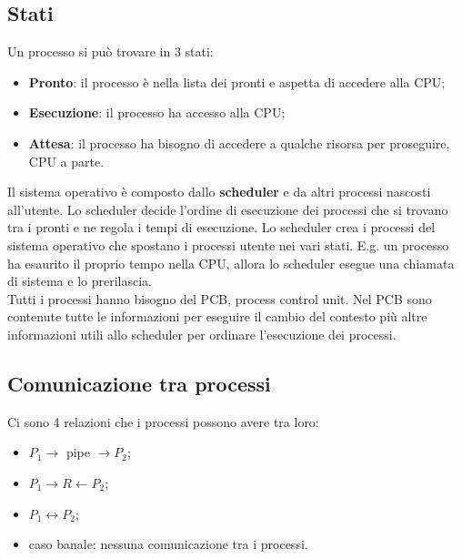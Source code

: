 \documentclass{article}
\begin{document}
\subsection{Stati}
Un processo si può trovare in 3 stati:
\begin{itemize}
  \item \textbf{Pronto}: il processo è nella lista dei pronti e aspetta di accedere alla CPU;

  \item \textbf{Esecuzione}: il processo ha accesso alla CPU;

  \item \textbf{Attesa}: il processo ha bisogno di accedere a qualche risorsa per proseguire, CPU a parte.
\end{itemize}

Il sistema operativo è composto dallo \textbf{scheduler} e da altri processi nascosti all'utente. Lo scheduler decide l'ordine di esecuzione dei processi che si trovano tra i pronti e ne regola i tempi di esecuzione. Lo scheduler crea i processi del sistema operativo che spostano i processi utente nei vari stati. E.g. un processo ha esaurito il proprio tempo nella CPU, allora lo scheduler esegue una chiamata di sistema e lo prerilascia.\\
Tutti i processi hanno bisogno del PCB, process control unit. Nel PCB sono contenute tutte le informazioni per eseguire il cambio del contesto più altre informazioni utili allo scheduler per ordinare l'esecuzione dei processi.

\subsection{Comunicazione tra processi}
Ci sono 4 relazioni che i processi possono avere tra loro:
\begin{itemize}
  \item $P_1 \rightarrow$ pipe $\rightarrow P_2$;

  \item $P_1 \rightarrow R \leftarrow P_2$;

  \item $P_1 \leftrightarrow P_2$;

  \item caso banale: nessuna comunicazione tra i processi.
\end{itemize}
\end{document}

